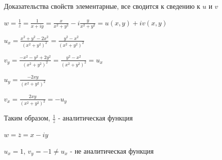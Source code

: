 \documentclass[12pt]{article}
\begin{document}
\Nota Доказательства свойств элементарные, все сводится к сведению к $u$ и $v$

\Ex $w = \frac{1}{z} = \frac{1}{x + iy} = \frac{x}{x^2 + y^2} - i \frac{y}{x^2 + y^2} = u(x, y) + i v(x, y)$

$u_x = \frac{x^2 + y^2 - 2x^2}{(x^2 + y^2)^2} = \frac{y^2 - x^2}{(x^2 + y^2)^2}$

$v_y = \frac{-x^2 - y^2 + 2y^2}{(x^2 + y^2)^2} = \frac{y^2 - x^2}{(x^2 + y^2)^2} = u_x$

$u_y = \frac{-2xy}{(x^2 + y^2)^2}$

$v_x = \frac{2xy}{(x^2 + y^2)^2} = -u_y$

Таким образом, $\frac{1}{z}$ - аналитическая функция

\Ex $w = \overline{z} = x - iy$

$u_x = 1$, $v_y = -1 \neq u_x$ - не аналитическая функция

\end{document}
